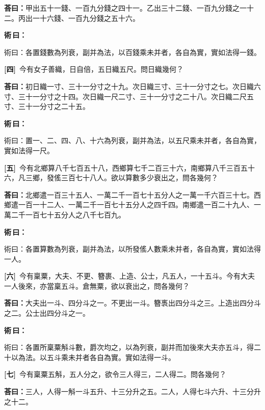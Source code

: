\documentclass[11pt,a4paper]{article}
\newenvironment{method}{%
  \par\noindent\textcolor{methodcolor}{\textbf{術\,曰：}}%
  \ignorespaces
}{\par\vspace{0.5em}}
\newcommand{\problemnum}[1]{\textbf{[\ignorespaces#1\unskip]}}
\begin{document}
\noindent\textcolor{answercolor}{\textbf{荅曰：}}甲出五十一錢、一百九分錢之四十一。乙出三十二錢、一百九分錢之一十二。丙出一十六錢、一百九分錢之五十六。

\begin{method}
術曰：各置錢數為列衰，副并為法，以百錢乘未并者，各自為實，實如法得一錢。
\end{method}

\noindent\problemnum{四}\,
今有女子善織，日自倍，五日織五尺。問日織幾何？

\noindent\textcolor{answercolor}{\textbf{荅曰：}}初日織一寸、三十一分寸之十九。次日織三寸、三十一分寸之七。次日織六寸、三十一分寸之十四。次日織一尺二寸、三十一分寸之二十八。次日織二尺五寸、三十一分寸之二十五。

\begin{method}
術曰：置一、二、四、八、十六為列衰，副并為法，以五尺乘未并者，各自為實，實如法得一尺。
\end{method}

\noindent\problemnum{五}\,
今有北鄉算八千七百五十八，西鄉算七千二百三十六，南鄉算八千三百五十六，凡三鄉，發傜三百七十八人。欲以算數多少衰出之，問各幾何？

\noindent\textcolor{answercolor}{\textbf{荅曰：}}北鄉遣一百三十五人、一萬二千一百七十五分人之一萬一千六百三十七。西鄉遣一百一十二人、一萬二千一百七十五分人之四千四。南鄉遣一百二十九人、一萬二千一百七十五分人之八千七百九。

\begin{method}
術曰：各置算數為列衰，副并為法，以所發傜人數乘未并者，各自為實，實如法得一人。
\end{method}

\noindent\problemnum{六}\,
今有稟粟，大夫、不更、簪裹、上造、公士，凡五人，一十五斗。今有大夫一人後來，亦當稟五斗。倉無粟，欲以衰出之，問各幾何？

\noindent\textcolor{answercolor}{\textbf{荅曰：}}大夫出一斗、四分斗之一。不更出一斗。簪褭出四分斗之三。上造出四分斗之二。公士出四分斗之一。

\begin{method}
術曰：各置所稟粟斛斗數，爵次均之，以為列衰，副并而加後來大夫亦五斗，得二十以為法。以五斗乘未并者各自為實。實如法得一斗。
\end{method}

\noindent\problemnum{七}\,
今有稟粟五斛，五人分之，欲令三人得三，二人得二。問各幾何？

\noindent\textcolor{answercolor}{\textbf{荅曰：}}三人，人得一斛一斗五升、十三分升之五。二人，人得七斗六升、十三分升之十二。
\end{document}
